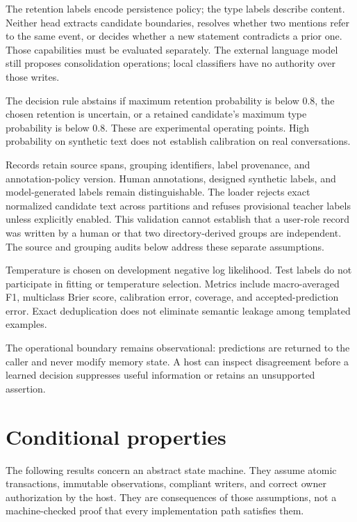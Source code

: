 \documentclass[11pt]{article}
\begin{document}
The retention labels encode persistence policy; the type labels describe content. Neither head extracts candidate boundaries, resolves whether two mentions refer to the same event, or decides whether a new statement contradicts a prior one. Those capabilities must be evaluated separately. The external language model still proposes consolidation operations; local classifiers have no authority over those writes.

The decision rule abstains if maximum retention probability is below $0.8$, the chosen retention is uncertain, or a retained candidate's maximum type probability is below $0.8$. These are experimental operating points. High probability on synthetic text does not establish calibration on real conversations.

Records retain source spans, grouping identifiers, label provenance, and annotation-policy version. Human annotations, designed synthetic labels, and model-generated labels remain distinguishable. The loader rejects exact normalized candidate text across partitions and refuses provisional teacher labels unless explicitly enabled. This validation cannot establish that a user-role record was written by a human or that two directory-derived groups are independent. The source and grouping audits below address these separate assumptions.

Temperature is chosen on development negative log likelihood. Test labels do not participate in fitting or temperature selection. Metrics include macro-averaged F1, multiclass Brier score, calibration error, coverage, and accepted-prediction error. Exact deduplication does not eliminate semantic leakage among templated examples.

The operational boundary remains observational: predictions are returned to the caller and never modify memory state. A host can inspect disagreement before a learned decision suppresses useful information or retains an unsupported assertion.



\section{Conditional properties}
The following results concern an abstract state machine. They assume atomic transactions, immutable observations, compliant writers, and correct owner authorization by the host. They are consequences of those assumptions, not a machine-checked proof that every implementation path satisfies them.
\end{document}
